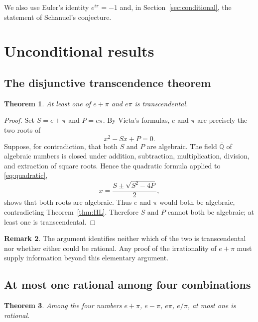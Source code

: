 \documentclass[11pt]{amsart}
\newtheorem{theorem}{Theorem}[section]
\theoremstyle{definition}
\newtheorem{remark}[theorem]{Remark}
\theoremstyle{remark}
\numberwithin{equation}{section}
\newcommand{\Qbar}{\overline{\mathbb{Q}}}
\newcommand{\ee}{e}
\begin{document}
We also use Euler's identity $\ee^{i\pi}=-1$ and, in Section~\ref{sec:conditional}, the statement of Schanuel's conjecture.

\section{Unconditional results}\label{sec:unconditional}

\subsection{The disjunctive transcendence theorem}

\begin{theorem}\label{thm:vieta}
At least one of $e+\pi$ and $e\pi$ is transcendental.
\end{theorem}

\begin{proof}
Set $S=e+\pi$ and $P=e\pi$. By Vieta's formulas, $e$ and $\pi$ are precisely the two roots of
\begin{equation}\label{eq:quadratic}
x^2-Sx+P=0.
\end{equation}
Suppose, for contradiction, that both $S$ and $P$ are algebraic. The field $\Qbar$ of algebraic numbers is closed under addition, subtraction, multiplication, division, and extraction of square roots. Hence the quadratic formula applied to \eqref{eq:quadratic},
\[
x=\frac{S\pm\sqrt{S^2-4P}}{2},
\]
shows that both roots are algebraic. Thus $e$ and $\pi$ would both be algebraic, contradicting Theorem~\ref{thm:HL}. Therefore $S$ and $P$ cannot both be algebraic; at least one is transcendental.
\end{proof}

\begin{remark}
The argument identifies neither which of the two is transcendental nor whether either could be rational. Any proof of the irrationality of $e+\pi$ must supply information beyond this elementary argument.
\end{remark}

\subsection{At most one rational among four combinations}

\begin{theorem}\label{thm:four}
Among the four numbers $e+\pi$, $e-\pi$, $e\pi$, $e/\pi$, at most one is rational.
\end{theorem}
\end{document}
